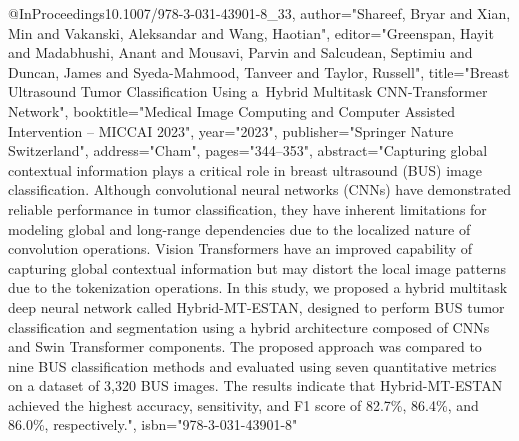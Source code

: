 @InProceedings{10.1007/978-3-031-43901-8_33,
author="Shareef, Bryar
and Xian, Min
and Vakanski, Aleksandar
and Wang, Haotian",
editor="Greenspan, Hayit
and Madabhushi, Anant
and Mousavi, Parvin
and Salcudean, Septimiu
and Duncan, James
and Syeda-Mahmood, Tanveer
and Taylor, Russell",
title="Breast Ultrasound Tumor Classification Using a Hybrid Multitask CNN-Transformer Network",
booktitle="Medical Image Computing and Computer Assisted Intervention -- MICCAI 2023",
year="2023",
publisher="Springer Nature Switzerland",
address="Cham",
pages="344--353",
abstract="Capturing global contextual information plays a critical role in breast ultrasound (BUS) image classification. Although convolutional neural networks (CNNs) have demonstrated reliable performance in tumor classification, they have inherent limitations for modeling global and long-range dependencies due to the localized nature of convolution operations. Vision Transformers have an improved capability of capturing global contextual information but may distort the local image patterns due to the tokenization operations. In this study, we proposed a hybrid multitask deep neural network called Hybrid-MT-ESTAN, designed to perform BUS tumor classification and segmentation using a hybrid architecture composed of CNNs and Swin Transformer components. The proposed approach was compared to nine BUS classification methods and evaluated using seven quantitative metrics on a dataset of 3,320 BUS images. The results indicate that Hybrid-MT-ESTAN achieved the highest accuracy, sensitivity, and F1 score of 82.7{\%}, 86.4{\%}, and 86.0{\%}, respectively.",
isbn="978-3-031-43901-8"
}
